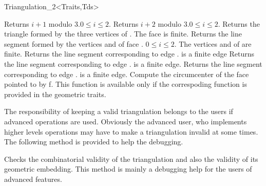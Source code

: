 \begin{ccRefClass}{Triangulation_2<Traits,Tds>}

{Returns $i+1$ modulo 3.\ccPrecond $0\leq i \leq 2$.}
\ccGlue
{}
{Returns $i+2$ modulo 3.\ccPrecond $0\leq i \leq 2$.}
\ccGlue
{}
{Returns the triangle formed by the three vertices of .
 \ccPrecond The face is finite.}
\ccGlue
{}
{Returns the line segment formed by the vertices 
 and  of face .
\ccPrecond $0\leq i \leq 2$. The vertices 
 and  of  
 are finite.}
\ccGlue
{}
{Returns the line segment corresponding to edge .
\ccPrecond {} is a finite edge}
\ccGlue
{}
{Returns the line segment corresponding to edge .
\ccPrecond {} is a finite edge.}
\ccGlue
{}
{Returns the line segment corresponding to edge .
\ccPrecond {} is a finite edge.}
\ccGlue
{}
{Compute the circumcenter of the face pointed to by f. This function
is available only if the correspoding function is provided in the
geometric traits.}

\begin{ccAdvanced}

The responsibility of keeping a valid triangulation
belongs to the users if advanced operations are used.
Obviously the advanced user, who implements higher levels operations
may have to make a triangulation invalid at some times. The following
method is provided to help the debugging.

{Checks the combinatorial validity of the triangulation and
also the validity of its geometric embedding.
 This method is  mainly a debugging help
for the users of advanced features.
}
\end{ccAdvanced}



\end{ccRefClass}
